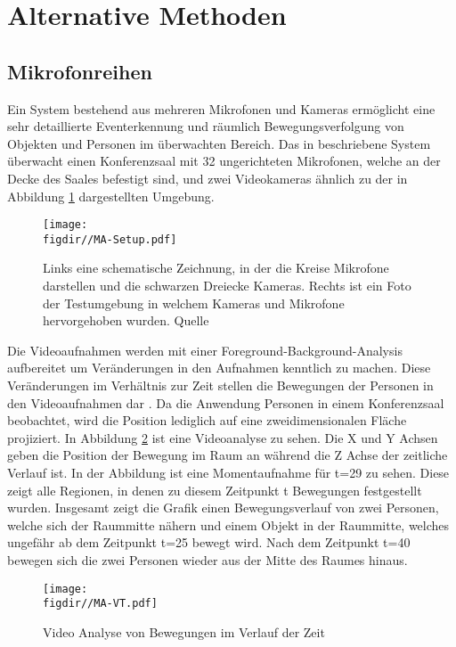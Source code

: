 \section{Alternative Methoden}
\subsection{Mikrofonreihen} \label{ss:array}
Ein System bestehend aus mehreren Mikrofonen und Kameras ermöglicht eine sehr detaillierte Eventerkennung und räumlich Bewegungsverfolgung von Objekten und Personen im überwachten Bereich. Das in \cite{Che02} beschriebene System überwacht einen Konferenzsaal mit 32 ungerichteten Mikrofonen, welche an der Decke des Saales befestigt sind, und zwei Videokameras ähnlich zu der in Abbildung \ref{FIG:Array:Setup} dargestellten Umgebung.

\begin{figure}
\centering
\texttt{[image: \\figdir//MA-Setup.pdf]}
\caption{Links eine schematische Zeichnung, in der die Kreise Mikrofone darstellen und die schwarzen Dreiecke Kameras. Rechts ist ein Foto der Testumgebung in welchem Kameras und Mikrofone hervorgehoben wurden. Quelle \cite{Array:Setup}}
\label{FIG:Array:Setup}
\end{figure}

Die Videoaufnahmen werden mit einer Foreground-Background-Analysis aufbereitet um Veränderungen in den Aufnahmen kenntlich zu machen. Diese Veränderungen im Verhältnis zur Zeit stellen die Bewegungen der Personen in den Videoaufnahmen dar \cite{Array:Video}. Da die Anwendung Personen in einem Konferenzsaal beobachtet, wird die Position lediglich auf eine zweidimensionalen Fläche projiziert. In Abbildung \ref{FIG:Array:Video} ist eine Videoanalyse zu sehen. Die X und Y Achsen geben die Position der Bewegung im Raum an während die Z Achse der zeitliche Verlauf ist. In der Abbildung ist eine Momentaufnahme für t=29 zu sehen. Diese zeigt alle Regionen, in denen zu diesem Zeitpunkt t Bewegungen festgestellt wurden. Insgesamt zeigt die Grafik einen Bewegungsverlauf von zwei Personen, welche sich der Raummitte nähern und einem Objekt in der Raummitte, welches ungefähr ab dem Zeitpunkt t=25 bewegt wird. Nach dem Zeitpunkt t=40 bewegen sich die zwei Personen wieder aus der Mitte des Raumes hinaus.

\begin{figure}
\centering
\texttt{[image: \\figdir//MA-VT.pdf]}
\caption{Video Analyse von Bewegungen im Verlauf der Zeit}
\label{FIG:Array:Video}
\end{figure}

